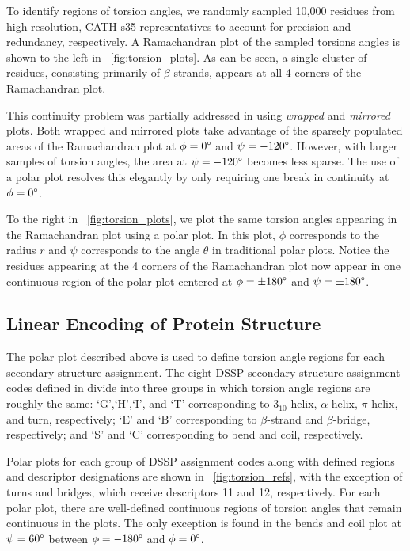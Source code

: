 \documentclass[a4,center,fleqn]{NAR}
\begin{document}
To identify regions of torsion angles, we randomly sampled 10,000 residues from high-resolution, CATH s35 representatives to account for precision and redundancy, respectively. 
A Ramachandran plot of the sampled torsions angles is shown to the left in \figurename~\ref{fig:torsion_plots}. 
As can be seen, a single cluster of residues, consisting primarily of $\beta$-strands, appears at all 4 corners of the Ramachandran plot.

This continuity problem was partially addressed in \cite{Karplus2010} using \emph{wrapped} and \emph{mirrored} plots. 
Both wrapped and mirrored plots take advantage of the sparsely populated areas of the Ramachandran plot at $\phi = 0\degree$ and $\psi = -120\degree$.
However, with larger samples of torsion angles, the area at $\psi = -120\degree$ becomes less sparse. 
The use of a polar plot resolves this elegantly by only requiring one break in continuity at $\phi = 0\degree$. 

To the right in \figurename~\ref{fig:torsion_plots}, we plot the same torsion angles appearing in the Ramachandran plot using a polar plot. 
In this plot, $\phi$ corresponds to the radius $r$ and $\psi$ corresponds to the angle $\theta$ in traditional polar plots. 
Notice the residues appearing at the 4 corners of the Ramachandran plot now appear in one continuous region of the polar plot centered at $\phi = \pm180\degree$ and $\psi = \pm180\degree$. 

\subsection{Linear Encoding of Protein Structure}

The polar plot described above is used to define torsion angle regions for each secondary structure assignment. 
The eight DSSP secondary structure assignment codes defined in \cite{Kabsch1983} divide into three groups in which torsion angle regions are roughly the same: `G',`H',`I', and `T' corresponding to $3_{10}$-helix, $\alpha$-helix, $\pi$-helix, and turn, respectively; `E' and `B' corresponding to $\beta$-strand and $\beta$-bridge, respectively; and `S' and `C' corresponding to bend and coil, respectively.

Polar plots for each group of DSSP assignment codes along with defined regions and descriptor designations are shown in \figurename~\ref{fig:torsion_refs}, with the exception of turns and bridges, which receive descriptors 11 and 12, respectively. 
For each polar plot, there are well-defined continuous regions of torsion angles that remain continuous in the plots. 
The only exception is found in the bends and coil plot at $\psi = 60\degree$ between $\phi = -180\degree$ and $\phi = 0\degree$.
\end{document}
